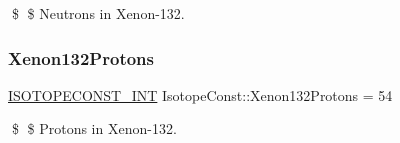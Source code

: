 \$ \$ Neutrons in Xenon-\/132. \mbox{\label{group___isotope_const-_xenon-_xe132_ga0fa8c8f70cb499bf62a079c9946a4ec5}} 
\subsubsection{\texorpdfstring{Xenon132\+Protons}{Xenon132Protons}}
{\footnotesize\ttfamily \mbox{\hyperlink{group___isotope_const-_macros_ga5f18360b3e99483a35c32d789e62621c}{I\+S\+O\+T\+O\+P\+E\+C\+O\+N\+S\+T\+\_\+\+I\+NT}} Isotope\+Const\+::\+Xenon132\+Protons = 54}

\$ \$ Protons in Xenon-\/132. 